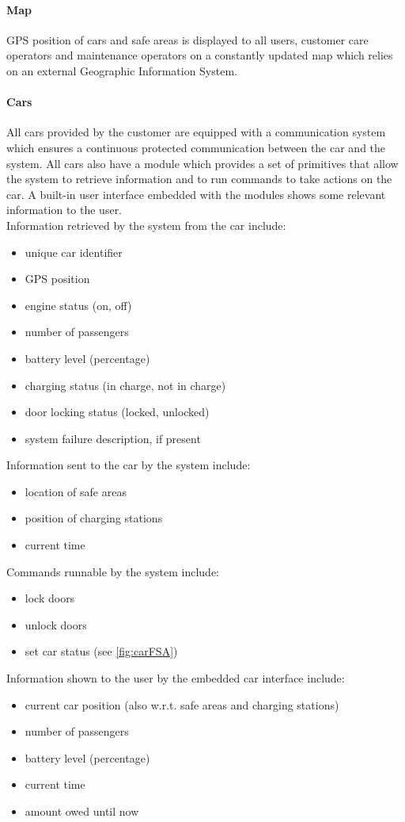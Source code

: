 	\paragraph{Map} GPS position of cars and safe areas is displayed to all users, customer care operators and maintenance operators on a constantly updated map which relies on an external Geographic Information System.

	\paragraph{Cars}\label{sec:cars}All cars provided by the customer are equipped with a communication system which ensures a continuous protected communication between the car and the system. All cars also have a module which provides a set of primitives that allow the system to retrieve information and to run commands to take actions on the car. A built-in user interface embedded with the modules shows some relevant information to the user.\\
	Information retrieved by the system from the car include:
	\begin{itemize}
		\item unique car identifier
		\item GPS position
		\item engine status (on, off)
		\item number of passengers
		\item battery level (percentage)
		\item charging status (in charge, not in charge)
		\item door locking status (locked, unlocked)
		\item system failure description, if present 
	\end{itemize}
	Information sent to the car by the system include:
	\begin{itemize}
		\item location of safe areas 
		\item position of charging stations
		\item current time
	\end{itemize}
	Commands runnable by the system include:
	\begin{itemize}
		\item lock doors
		\item unlock doors
		\item set car status (see \autoref{fig:carFSA}) 
	
	\end{itemize}		
	Information shown to the user by the embedded car interface include:
	\begin{itemize}
		\item current car position (also w.r.t. safe areas and charging stations)
		\item number of passengers
		\item battery level (percentage)
		\item current time
		\item amount owed until now
	\end{itemize}

